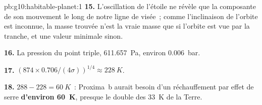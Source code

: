 \begin{solution}{pb:g10:habitable-planet:1}
\textbf{15.} L'oscillation de l'étoile ne révèle que la composante de son
mouvement le long de notre ligne de visée~; comme l'inclinaison de l'orbite
est inconnue, la masse trouvée n'est la vraie masse que si l'orbite est vue
par la tranche, et une valeur minimale sinon.

\textbf{16.} La pression du point triple, \qty{611.657}{Pa}, environ
\qty{0.006}{bar}.

\textbf{17.} $(874 \times 0.706/(4\sigma))^{1/4} \approx \qty{228}{K}$.

\textbf{18.} $288 - 228 = \qty{60}{K}$~: Proxima~b aurait besoin d'un
réchauffement par effet de serre \textbf{d'environ \qty{60}{K}}, presque le
double des \qty{33}{K} de la Terre.
\end{solution}
